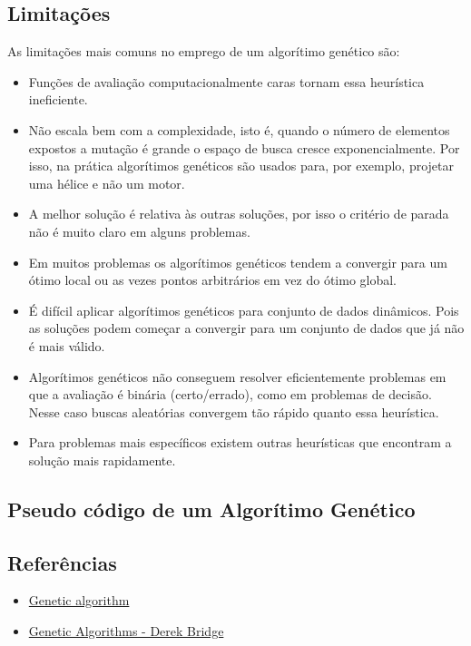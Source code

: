 \subsection{Limitações}

As limitações mais comuns no emprego de um algorítimo genético são:

\begin{itemize}
\itemsep1pt\parskip0pt
\item
  Funções de avaliação computacionalmente caras tornam essa heurística
  ineficiente.
\item
  Não escala bem com a complexidade, isto é, quando o número de
  elementos expostos a mutação é grande o espaço de busca cresce
  exponencialmente. Por isso, na prática algorítimos genéticos são
  usados para, por exemplo, projetar uma hélice e não um motor.
\item
  A melhor solução é relativa às outras soluções, por isso o critério de
  parada não é muito claro em alguns problemas.
\item
  Em muitos problemas os algorítimos genéticos tendem a convergir para
  um ótimo local ou as vezes pontos arbitrários em vez do ótimo global.
\item
  É difícil aplicar algorítimos genéticos para conjunto de dados
  dinâmicos. Pois as soluções podem começar a convergir para um conjunto
  de dados que já não é mais válido.
\item
  Algorítimos genéticos não conseguem resolver eficientemente problemas
  em que a avaliação é binária (certo/errado), como em problemas de
  decisão. Nesse caso buscas aleatórias convergem tão rápido quanto essa
  heurística.
\item
  Para problemas mais específicos existem outras heurísticas que
  encontram a solução mais rapidamente.
\end{itemize}

\subsection{Pseudo código de um Algorítimo Genético}


\subsection{Referências}

\begin{itemize}
\itemsep1pt\parskip0pt
\item
  \href{http://en.wikipedia.org/wiki/Genetic\_algorithm}{Genetic algorithm}
\item
  \href{http://www.cs.ucc.ie/~dgb/courses/tai/notes/handout12.pdf}{Genetic Algorithms - Derek Bridge}
\end{itemize}
